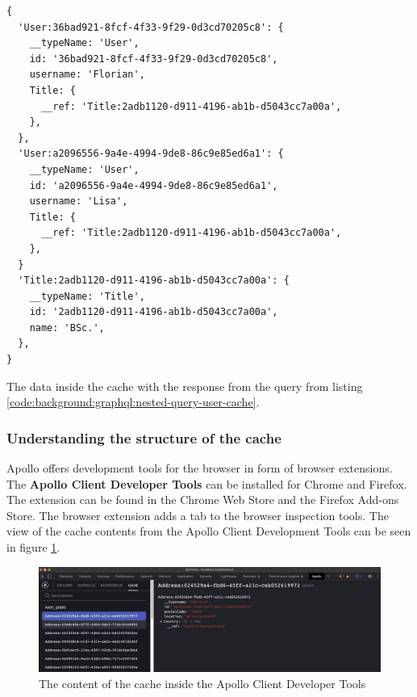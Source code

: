 \ifshowListings
\begin{listing}[H]
    \begin{verbatim}
{
  'User:36bad921-8fcf-4f33-9f29-0d3cd70205c8': {
    __typeName: 'User',
    id: '36bad921-8fcf-4f33-9f29-0d3cd70205c8',
    username: 'Florian',
    Title: {
      __ref: 'Title:2adb1120-d911-4196-ab1b-d5043cc7a00a',
    },
  },
  'User:a2096556-9a4e-4994-9de8-86c9e85ed6a1': {
    __typeName: 'User',
    id: 'a2096556-9a4e-4994-9de8-86c9e85ed6a1',
    username: 'Lisa',
    Title: {
      __ref: 'Title:2adb1120-d911-4196-ab1b-d5043cc7a00a',
    },
  }
  'Title:2adb1120-d911-4196-ab1b-d5043cc7a00a': {
    __typeName: 'Title',
    id: '2adb1120-d911-4196-ab1b-d5043cc7a00a',
    name: 'BSc.',
  },
}
    \end{verbatim}
    \caption{The data inside the cache with the response from the query from listing \ref{code:background:graphql:nested-query-user-cache}.}\label{code:background:graphql:nested-query-user-cache-representation}
\end{listing}
\fi

\subsubsection{Understanding the structure of the cache}\label{subsubsection:background:graphql:apollo-server-client:understanding-cache-structure}

Apollo offers development tools for the browser in form of browser extensions. The \textbf{Apollo Client Developer Tools} can be installed for Chrome and Firefox. The extension can be found in the Chrome Web Store and the Firefox Add-ons Store. The browser extension adds a tab to the browser inspection tools. \cite{misc:-:background:graphql:apollo-developer-tools} The view of the cache contents from the Apollo Client Development Tools can be seen in figure \ref{fig:background:graphql:apollo:apollo-dev-tools}.

\ifshowImages
\begin{figure}[H]
    \centering
    \includegraphics[width=1\linewidth]{images/background/apollo/apollo-dev-tools.jpeg}
    \caption{The content of the cache inside the Apollo Client Developer Tools}\label{fig:background:graphql:apollo:apollo-dev-tools}
\end{figure}
\fi

